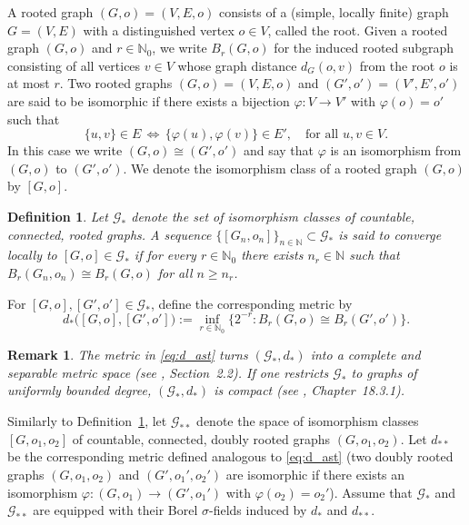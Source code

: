 \documentclass[11pt]{article}
\newcommand{\be}{\begin{equation}}
\newcommand{\ee}{\end{equation}}
\newtheorem{remark}[theorem]{Remark}
\newtheorem{definition}[theorem]{Definition}
\numberwithin{equation}{section}
\begin{document}
A rooted graph $(G,o)=(V,E,o)$ consists of a (simple, locally finite) graph $G=(V,E)$ with a distinguished vertex $o\in V$, called the root. Given a rooted graph $(G,o)$ and $r\in\mathbb N_0$, we write $B_r(G,o)$ for the induced rooted subgraph consisting of all vertices $v\in V$ whose graph distance $d_G(o,v)$ from the root $o$ is at most $r$. Two rooted graphs $(G,o)=(V,E,o)$ and $(G',o')=(V',E',o')$ are said to be isomorphic if there exists a bijection $\varphi:V\to V'$ with $\varphi(o)=o'$ such that
$$
\{u,v\}\in E \,\Longleftrightarrow\, \{\varphi(u),\varphi(v)\}\in E',\quad\text{for all }u,v\in V.
$$
In this case we write $(G,o)\cong (G',o')$ and say that $\varphi$ is an isomorphism from $(G,o)$ to $(G',o')$. We denote the isomorphism class of a rooted graph $(G,o)$ by $[G,o]$.
\begin{definition}\label{def:local-convergence}
Let $\mathcal G_\ast$ denote the set of isomorphism classes of countable, connected, rooted graphs. A sequence $\{[G_n,o_n]\}_{n\in\mathbb N}\subset\mathcal G_\ast$ is said to converge locally to $[G,o]\in\mathcal G_\ast$ if for every $r\in\mathbb N_0$ there exists $n_r\in\mathbb N$ such that $B_r(G_n,o_n)\cong B_r(G,o)$ for all $n\ge n_r$. 
\end{definition}
For $[G,o],[G',o']\in \mathcal G_\ast$, define the corresponding metric by
\be\label{eq:d_ast}
d_\ast\big([G,o],[G',o']\big):=\inf_{r\in\mathbb N_0}\big\{2^{-r}:B_r(G,o)\cong B_r(G',o')\big\}.
\ee
\begin{remark}
The metric in \eqref{eq:d_ast} turns $(\mathcal G_\ast, d_\ast)$ into a complete and separable metric space (see \cite{aldous2004objective}, Section~2.2). If one restricts $\mathcal G_\ast$ to graphs of uniformly bounded degree, $(\mathcal G_\ast, d_\ast)$ is compact (see \cite{lovasz2012large}, Chapter~18.3.1).
\end{remark}

Similarly to Definition~\ref{def:local-convergence}, let \(\mathcal G_{\ast\ast}\) denote the space of isomorphism classes $[G,o_1,o_2]$ of countable, connected, doubly rooted graphs \((G,o_1,o_2)\). Let $d_{\ast\ast}$ be the corresponding metric defined analogous to \eqref{eq:d_ast} (two doubly rooted graphs \((G,o_1,o_2)\) and \((G',o_1',o_2')\) are isomorphic if there exists an isomorphism \(\varphi:(G,o_1)\to(G',o_1')\) with $\varphi(o_2)=o_2'$). Assume that $\mathcal{G}_\ast$ and $\mathcal{G}_{\ast\ast}$ are equipped with their Borel \(\sigma\)-fields induced by $d_\ast$ and $d_{\ast\ast}$.
\end{document}
